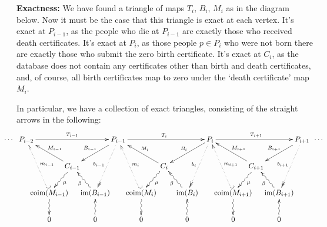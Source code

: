 \documentclass[11pt]{article}
\begin{document}
\Bullet \textbf{Exactness:} We have found a triangle of maps
$T_{i},\,B_{i},\,M_{i}$ as in the diagram below. Now it must be the case that
this triangle is exact at each vertex. It's exact at $P_{i-1}$, as the people
who die at $P_{i-1}$ are exactly those who received death certificates. It's
exact at $P_i$, as those people $p\in P_i$ who were not born there are exactly
those who submit the zero birth certificate. It's exact at $C_i$, as the
database does not contain any certificates other than birth and death
certificates, and, of course, all birth certificates map to zero under the
`death certificate' map $M_i$.

In particular, we have a collection of exact triangles, consisting of the
straight arrows in the following:
\[\xymatrix@!0@C=1.1cm@R=1.28cm{
\makebox[0cm][r]{$\cdots$\ \ }
P_{i-2}\ar[rrrr]^{T_{i-1}}%
&&&&\ar[dll]_{B_{i-1}}
\ar@{..>>}[ddl]_{b_{i-1}}
P_{i-1}\ar[rrrr]^{T_{i  }}%
&&&&\ar[dll]_{B_{i  }}
\ar@{..>>}[ddl]_{b_{i  }}
P_{i  }\ar[rrrr]^{T_{i+1}}%
&&&&\ar[dll]_{B_{i+1}}
\ar@{..>>}[ddl]_{b_{i+1}}
P_{i+1}\makebox[0cm][l]{\ \ $\cdots$}\\
&&C_{i-1}\ar[ull]_{M_{i-1}}\ar@{~>}[dl]^\mu&&
&&C_{i  }\ar[ull]_{M_{i  }}\ar@{~>}[dl]^\mu&&
&&C_{i+1}\ar[ull]_{M_{i+1}}\ar@{~>}[dl]^\mu&&
\\
&\coim(M_{i-1})\ar@{~>}[d]\ar@{_{(}..>}[uul]_{m_{i-1}}
&&\im(B_{i-1})\ar@{~>}[ul]^\beta&
&\coim(M_{i  })\ar@{~>}[d]\ar@{_{(}..>}[uul]_{m_{i  }}
&&\im(B_{i  })\ar@{~>}[ul]^\beta&
&\coim(M_{i+1})\ar@{~>}[d]\ar@{_{(}..>}[uul]_{m_{i+1}}
&&\im(B_{i+1})\ar@{~>}[ul]^\beta&
\\
&0&&0\ar@{~>}[u]&
&0&&0\ar@{~>}[u]&
&0&&0\ar@{~>}[u]&
}\]
\end{document}
